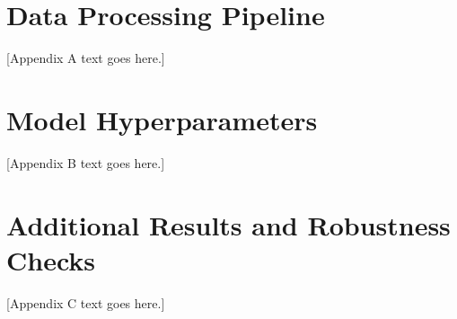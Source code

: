 \documentclass[12pt, a4paper]{article}
\begin{document}
\section{Data Processing Pipeline}
\label{app:pipeline}

[Appendix A text goes here.]

\section{Model Hyperparameters}
\label{app:hyperparams}

[Appendix B text goes here.]

\section{Additional Results and Robustness Checks}
\label{app:robustness}

[Appendix C text goes here.]
\end{document}
